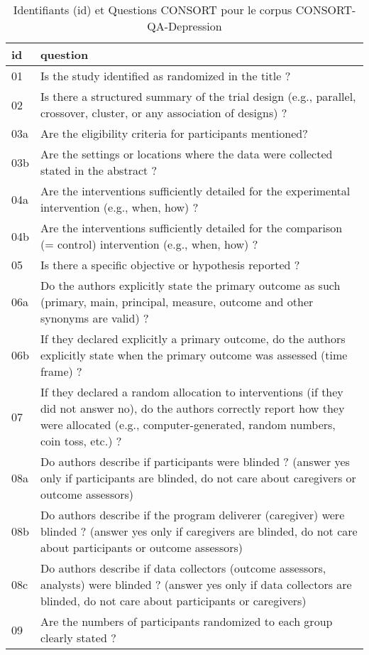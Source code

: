 \begin{table}[!ht]
\caption{Identifiants (id) et Questions CONSORT pour le corpus CONSORT-QA-Depression}
\label{tab:covid_global_perf}
\begin{tabular}{ll}
\toprule
id & question \\
\midrule
01 & Is the study identified as randomized in the title ? \\
02 & Is there a structured summary of the trial design (e.g., parallel, crossover, cluster, or any association of designs) ? \\
03a & Are the eligibility criteria for participants mentioned? \\
03b & Are the settings or locations where the data were collected stated in the abstract ? \\
04a & Are the interventions sufficiently detailed for the experimental intervention (e.g., when, how) ? \\
04b & Are the interventions sufficiently detailed for the comparison (= control) intervention  (e.g., when, how) ? \\
05 & Is there a specific objective or hypothesis reported ? \\
06a & Do the authors explicitly state the primary outcome as such (primary, main, principal, measure, outcome and other synonyms are valid) ? \\
06b & If they declared explicitly a primary outcome, do the authors explicitly state when the primary outcome was assessed (time frame) ? \\
07 & If they declared a random allocation to interventions (if they did not answer no), do the authors correctly report how they were allocated (e.g., computer-generated, random numbers, coin toss, etc.) ? \\
08a & Do authors describe if participants were blinded ? (answer yes only if participants are blinded, do not care about caregivers or outcome assessors) \\
08b & Do authors describe if the program deliverer (caregiver) were blinded ? (answer yes only if caregivers are blinded, do not care about participants or outcome assessors) \\
08c & Do authors describe if data collectors (outcome assessors, analysts) were blinded ? (answer yes only if data collectors are blinded, do not care about participants or caregivers) \\
09 & Are the numbers of participants randomized to each group clearly stated ? \\

\end{tabular}
\end{table}
